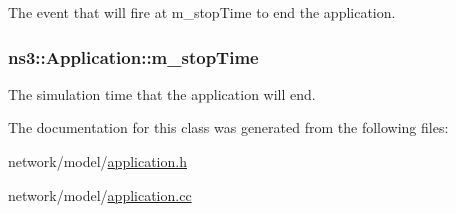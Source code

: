 The event that will fire at m\+\_\+stop\+Time to end the application. 

\subsubsection[{\texorpdfstring{m\+\_\+stop\+Time}{m_stopTime}}]{ ns3\+::\+Application\+::m\+\_\+stop\+Time\hspace{0.3cm}{\ttfamily [protected]}}\hypertarget{classns3_1_1Application_a4c53bba994e27f37baaa718835da3e20}{}\label{classns3_1_1Application_a4c53bba994e27f37baaa718835da3e20}


The simulation time that the application will end. 



The documentation for this class was generated from the following files\+:\begin{DoxyCompactItemize}
\item 
network/model/\hyperlink{application_8h}{application.\+h}\item 
network/model/\hyperlink{application_8cc}{application.\+cc}\end{DoxyCompactItemize}
